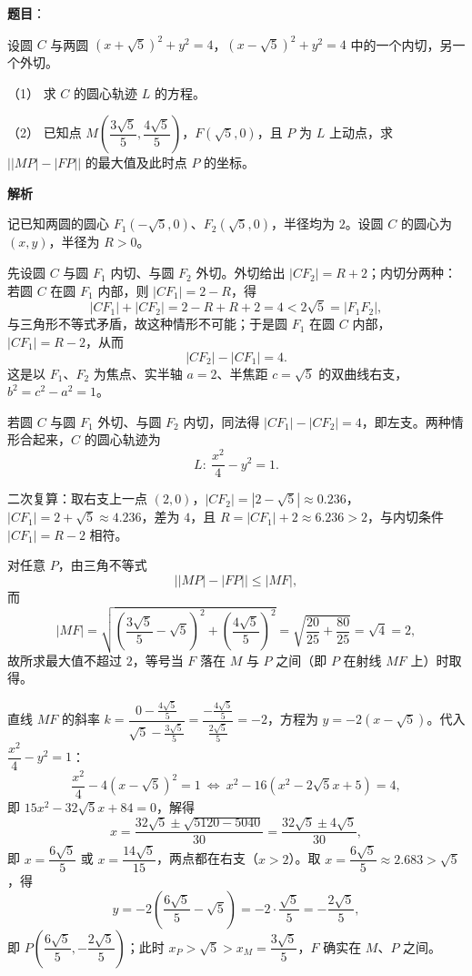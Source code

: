 \begin{answer}

\textbf{题目}：

设圆 $C$ 与两圆 $(x+\sqrt5)^2+y^2=4$，$(x-\sqrt5)^2+y^2=4$ 中的一个内切，另一个外切。

（1） 求 $C$ 的圆心轨迹 $L$ 的方程。

（2） 已知点 $M\left(\dfrac{3\sqrt5}{5},\dfrac{4\sqrt5}{5}\right)$，$F(\sqrt5,0)$，且 $P$ 为 $L$ 上动点，求 $\bigl||MP|-|FP|\bigr|$ 的最大值及此时点 $P$ 的坐标。

\textbf{解析}

记已知两圆的圆心 $F_1(-\sqrt5,0)$、$F_2(\sqrt5,0)$，半径均为 $2$。设圆 $C$ 的圆心为 $(x,y)$，半径为 $R>0$。

先设圆 $C$ 与圆 $F_1$ 内切、与圆 $F_2$ 外切。外切给出 $|CF_2|=R+2$；内切分两种：若圆 $C$ 在圆 $F_1$ 内部，则 $|CF_1|=2-R$，得
\nopagebreak[4]
\[|CF_1|+|CF_2|=2-R+R+2=4<2\sqrt5=|F_1F_2|,\]
与三角形不等式矛盾，故这种情形不可能；于是圆 $F_1$ 在圆 $C$ 内部，$|CF_1|=R-2$，从而
\nopagebreak[4]
\[|CF_2|-|CF_1|=4.\]
这是以 $F_1$、$F_2$ 为焦点、实半轴 $a=2$、半焦距 $c=\sqrt5$ 的双曲线右支，$b^2=c^2-a^2=1$。

若圆 $C$ 与圆 $F_1$ 外切、与圆 $F_2$ 内切，同法得 $|CF_1|-|CF_2|=4$，即左支。两种情形合起来，$C$ 的圆心轨迹为
\nopagebreak[4]
\[L:\ \frac{x^2}{4}-y^2=1.\]

二次复算：取右支上一点 $(2,0)$，$|CF_2|=|2-\sqrt5|\approx0.236$，$|CF_1|=2+\sqrt5\approx4.236$，差为 $4$，且 $R=|CF_1|+2\approx6.236>2$，与内切条件 $|CF_1|=R-2$ 相符。

对任意 $P$，由三角不等式
\nopagebreak[4]
\[\bigl||MP|-|FP|\bigr|\leqslant|MF|,\]
而
\nopagebreak[4]
\[|MF|=\sqrt{\left(\frac{3\sqrt5}{5}-\sqrt5\right)^2+\left(\frac{4\sqrt5}{5}\right)^2}=\sqrt{\frac{20}{25}+\frac{80}{25}}=\sqrt4=2,\]
故所求最大值不超过 $2$，等号当 $F$ 落在 $M$ 与 $P$ 之间（即 $P$ 在射线 $MF$ 上）时取得。

直线 $MF$ 的斜率 $k=\dfrac{0-\frac{4\sqrt5}{5}}{\sqrt5-\frac{3\sqrt5}{5}}=\dfrac{-\frac{4\sqrt5}{5}}{\frac{2\sqrt5}{5}}=-2$，方程为 $y=-2(x-\sqrt5)$。代入 $\dfrac{x^2}{4}-y^2=1$：
\nopagebreak[4]
\[\frac{x^2}{4}-4(x-\sqrt5)^2=1\ \Longleftrightarrow\ x^2-16(x^2-2\sqrt5x+5)=4,\]
即 $15x^2-32\sqrt5x+84=0$，解得
\nopagebreak[4]
\[x=\frac{32\sqrt5\pm\sqrt{5120-5040}}{30}=\frac{32\sqrt5\pm4\sqrt5}{30},\]
即 $x=\dfrac{6\sqrt5}{5}$ 或 $x=\dfrac{14\sqrt5}{15}$，两点都在右支（$x>2$）。取 $x=\dfrac{6\sqrt5}{5}\approx2.683>\sqrt5$，得
\nopagebreak[4]
\[y=-2\left(\frac{6\sqrt5}{5}-\sqrt5\right)=-2\cdot\frac{\sqrt5}{5}=-\frac{2\sqrt5}{5},\]
即 $P\left(\dfrac{6\sqrt5}{5},-\dfrac{2\sqrt5}{5}\right)$；此时 $x_P>\sqrt5>x_M=\dfrac{3\sqrt5}{5}$，$F$ 确实在 $M$、$P$ 之间。


\end{answer}
